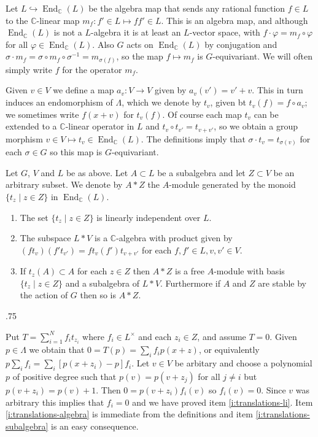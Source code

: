 \documentclass[11pt,fleqn]{amsart}
\makeatletter
\renewcommand\proofname{Proof}
\renewenvironment{proof}[1][\textit{\proofname}]{\par
 \pushQED{\qed}%
 \normalfont \topsep.75\paraskip\relax
 \trivlist
 \item[\hskip\labelsep
 \itshape
 #1\@addpunct{.}]\ignorespaces
}{%
 \popQED\endtrivlist\@endpefalse
}
\newcounter{para}[section]
\newcommand\CC{\mathbb C}
\renewcommand\to{\longrightarrow}
\renewcommand\phi{\varphi}
\DeclareMathOperator\End{End}
\makeatother
\begin{document}
Let $L \hookrightarrow \End_\CC(L)$ be the algebra map that sends any rational 
function $f \in L$ to the $\CC$-linear map $m_f: f' \in L \mapsto ff' \in L$.
This is an algebra map, and although $\End_\CC(L)$ is not a $L$-algebra it is
at least an $L$-vector space, with $f \cdot \phi = m_f \circ \phi$ for all
$\phi \in \End_\CC(L)$. Also $G$ acts on $\End_\CC(L)$ by conjugation and 
$\sigma \cdot m_f = \sigma \circ m_f \circ \sigma^{-1} = m_{\sigma(f)}$, so 
the map $f \mapsto m_f$ is $G$-equivariant. We will often simply write $f$ for 
the operator $m_f$.

Given $v \in V$ we define a map $a_v: V \to V$ given by $a_v(v') = v'+v$. This
in turn induces an endomorphism of $\Lambda$, which we denote by $t_v$, given 
bt $t_v(f) = f \circ a_{v}$; we sometimes write $f(x+v)$ for $t_v(f)$. Of
course each map $t_v$ can be extended to a $\CC$-linear operator in $L$ and
$t_v \circ t_{v'} = t_{v+v'}$, so we obtain a group morphism $v \in V \mapsto
t_v \in \End_\CC(L)$. The definitions imply that $\sigma \cdot t_v = 
t_{\sigma(v)}$ for each $\sigma \in G$ so this map is $G$-equivariant.


\begin{Lemma}
Let $G$, $V$ and $L$ be as above. Let $A \subset L$ be a subalgebra and let 
$Z \subset V$ be an arbitrary subset. We denote by $A * Z$ the $A$-module 
generated by the monoid $\{t_z \mid z \in Z\}$ in $\End_\CC(L)$. 
\begin{enumerate}
\item 
\label{i:translations-li}
The set $\{t_z \mid z \in Z\}$ is linearly independent over $L$.

\item 
\label{i:translations-algebra}
The subspace $L*V$ is a $\CC$-algebra with product given by $(ft_v)(f't_{v'}) 
= f t_v(f') t_{v+v'}$ for each $f,f' \in L, v,v' \in V$.

\item
\label{i:translations-subalgebra}
If $t_z(A) \subset A$ for each $z \in Z$ then $A * Z$ is a free $A$-module 
with basis $\{t_z \mid z \in Z\}$ and a subalgebra of $L * V$. Furthermore if 
$A$ and $Z$ are stable by the action of $G$ then so is $A * Z$.
\end{enumerate}
\end{Lemma}
\begin{proof}
Put $T = \sum_{i=1}^N f_i t_{z_i}$ where $f_i \in L^\times$ and each $z_i 
\in Z$, and assume $T = 0$. Given $p \in \Lambda$ we obtain that $0 = T(p) = 
\sum_i f_i p(x+z)$, or equivalently $p \sum_i f_i = \sum_i [p(x+z_i)- p] f_i$. 
Let $v \in V$ be arbitary and choose a polynomial $p$ of positive degree such 
that $p(v) = p(v + z_j)$ for all $j \neq i$ but $p(v + z_i) = p(v) + 1$. Then 
$0 = p(v+z_i) f_i(v)$ so $f_i(v) = 0$. Since $v$ was arbitrary this implies 
that $f_i = 0$ and we have proved item \ref{i:translations-li}. Item 
\ref{i:translations-algebra} is immediate from the definitions and item 
\ref{i:translations-subalgebra} is an easy consequence. 
\end{proof}
\end{document}
